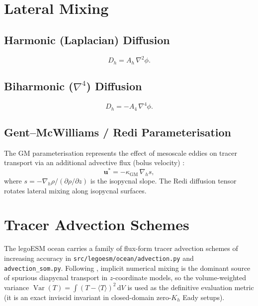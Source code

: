 \documentclass[11pt,twoside]{report}
\newcommand{\dd}{\mathrm{d}}
\newcommand{\pp}{\partial}
\newcommand{\vect}[1]{\bm{#1}}
\newcommand{\grad}{\nabla}
\DeclareMathOperator{\Var}{Var}
\begin{document}
\section{Lateral Mixing}
\label{sec:lateral}

\subsection{Harmonic (Laplacian) Diffusion}
\begin{equation}
  D_h = A_h\,\nabla^2\phi.
\end{equation}

\subsection{Biharmonic ($\nabla^4$) Diffusion}
\begin{equation}
  D_h = -A_4\,\nabla^4\phi.
\end{equation}

\subsection{Gent--McWilliams / Redi Parameterisation}

The GM parameterisation represents the effect of mesoscale eddies on
tracer transport via an additional advective flux (bolus velocity)
\citep{GM1990}:
\begin{equation}
  \vect{u}^* = -\kappa_{\mathrm{GM}}\,\grad_h s,
\end{equation}
where $s=-\grad_h\rho/(\pp\rho/\pp z)$ is the isopycnal slope.
The Redi diffusion tensor rotates lateral mixing along isopycnal surfaces.


\section{Tracer Advection Schemes}
\label{sec:ocean-advection}

The legoESM ocean carries a family of flux-form tracer advection
schemes of increasing accuracy in
\texttt{src/legoesm/ocean/advection.py} and
\texttt{advection\_som.py}.  Following \citet{Hill2012}, implicit
numerical mixing is the dominant source of spurious diapycnal
transport in $z$-coordinate models, so the volume-weighted variance
$\Var(T) = \int (T-\langle T\rangle)^2\,\dd V$ is used as the
definitive evaluation metric (it is an exact inviscid invariant in
closed-domain zero-$K_h$ Eady setups).
\end{document}
